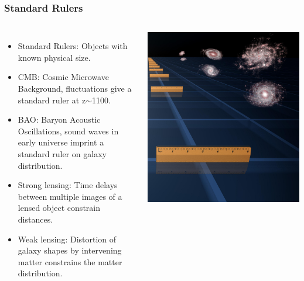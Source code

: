 \documentclass[aspectratio=169]{beamer}
\begin{document}
\begin{frame}
    \frametitle{Standard Rulers}
    \begin{columns}
        \begin{itemize}
            \item Standard Rulers: Objects with known physical size.
\item CMB: Cosmic Microwave Background, fluctuations give a standard ruler at z$\sim$1100. \hfill {}
            \item BAO: Baryon Acoustic Oscillations, sound waves in early universe imprint a standard ruler on galaxy distribution. \hfill {}
            \item Strong lensing: Time delays between multiple images of a lensed object constrain distances. \hfill {}
            \item Weak lensing: Distortion of galaxy shapes by intervening matter constrains the matter distribution.
        \end{itemize}
        \includegraphics[width=\textwidth]{figures/rulers.jpg}
    \end{columns}
\end{frame}
\end{document}
